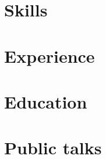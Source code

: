 \documentclass[letter,10pt]{article}
\begin{document}


\section{Skills}


\section{Experience}


\section{Education}



\section{Public talks}

\end{document}
